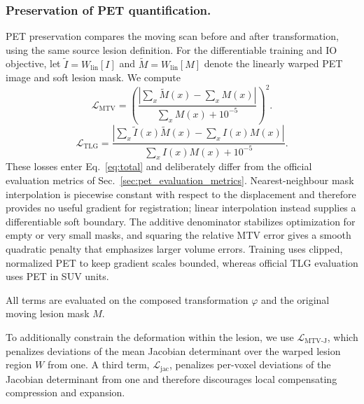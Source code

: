 \subsubsection{Preservation of PET quantification.}

\begin{journaladdition}
PET preservation compares the moving scan before and after transformation, using the same source lesion definition.
For the differentiable training and IO objective, let $\widetilde I=W_{\mathrm{lin}}[I]$ and $\widetilde M=W_{\mathrm{lin}}[M]$ denote the linearly warped PET image and soft lesion mask.
We compute
\begin{equation}
  \mathcal{L}_{\mathrm{MTV}}=
  \left(
  \frac{\left|\sum_x\widetilde M(x)-\sum_xM(x)\right|}{\sum_xM(x)+10^{-5}}
  \right)^2.
  \label{eq:mtv_training_loss}
\end{equation}
\begin{equation}
  \mathcal{L}_{\mathrm{TLG}}=
  \frac{\left|\sum_x\widetilde I(x)\widetilde M(x)-\sum_xI(x)M(x)\right|}
  {\sum_xI(x)M(x)+10^{-5}}.
  \label{eq:tlg_training_loss}
\end{equation}
These losses enter Eq.~\eqref{eq:total} and deliberately differ from the official evaluation metrics of Sec.~\ref{sec:pet_evaluation_metrics}.
Nearest-neighbour mask interpolation is piecewise constant with respect to the displacement and therefore provides no useful gradient for registration; linear interpolation instead supplies a differentiable soft boundary.
The additive denominator stabilizes optimization for empty or very small masks, and squaring the relative MTV error gives a smooth quadratic penalty that emphasizes larger volume errors.
Training uses clipped, normalized PET to keep gradient scales bounded, whereas official TLG evaluation uses PET in SUV units.
\end{journaladdition}
All terms are evaluated on the composed transformation $\varphi$ and the original moving lesion mask $M$.

To additionally constrain the deformation within the lesion, we use $\mathcal{L}_{\mathrm{MTV\text{-}J}}$, which penalizes deviations of the mean Jacobian determinant over the warped lesion region $W$ from one.
A third term, $\mathcal{L}_{\mathrm{jac}}$, penalizes per-voxel deviations of the Jacobian determinant from one and therefore discourages local compensating compression and expansion.

